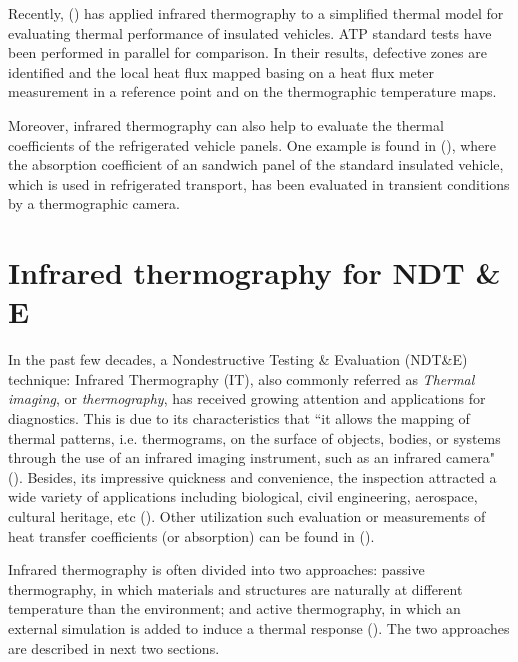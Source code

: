 Recently, (\citet{rossi2009k}) has applied infrared thermography to a simplified thermal model for evaluating thermal performance of insulated vehicles. ATP standard tests have been performed in parallel for comparison. In their results, defective zones are identified and the local heat flux mapped basing on a heat flux meter measurement in a reference point and on the thermographic temperature maps.

Moreover, infrared thermography can also help to evaluate the thermal coefficients of the refrigerated vehicle panels. One example is found in (\citet{dragano2009experimental}), where the absorption coefficient of an sandwich panel of the standard insulated vehicle, which is used in refrigerated transport, has been evaluated in transient conditions by a thermographic camera.



\newpage
\section*{Infrared thermography for NDT \& E}

In the past few decades, a Nondestructive Testing \& Evaluation (NDT\&E) technique: Infrared Thermography (IT), also commonly referred as \textit{Thermal imaging}, or \textit{thermography}, has received growing attention and applications for diagnostics. This is due to its characteristics that ``it allows the mapping of thermal patterns, i.e. thermograms, on the surface of objects, bodies, or systems through the use of an infrared imaging instrument, such as an infrared camera" (\citet{maldague3introduction}). Besides, its impressive quickness and convenience, the inspection attracted a wide variety of applications including biological, civil engineering, aerospace, cultural heritage, etc (\citet{2007-Ibarra-Castanedo,2000-Li,cielo1987thermographie,shoja2011inspection,pradere2009microscale,avdelidis2004applications,maierhofer2005quantitative}). Other utilization such evaluation or measurements of heat transfer coefficients (or absorption) can be found in (\citet{dragano2009experimental,grinzato2010r,grinzatoquality,grinzato1comparison,rossi2009k}).

Infrared thermography is often divided into two approaches: passive thermography, in which materials and structures are naturally at different temperature than the environment; and active thermography, in which an external simulation is added to induce a thermal response (\citet{Maldague2001theory}). The two approaches are described in next two sections.
